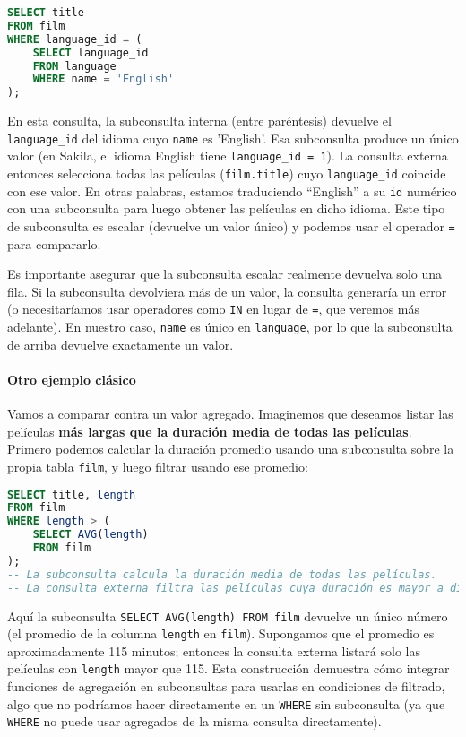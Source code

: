 \documentclass[12pt,a4paper]{article}
\begin{document}
\begin{lstlisting}[language=SQL]
SELECT title
FROM film
WHERE language_id = (
	SELECT language_id
	FROM language
	WHERE name = 'English'
);
\end{lstlisting}


En esta consulta, la subconsulta interna (entre paréntesis) devuelve el \texttt{language\_id} del idioma cuyo \texttt{name} es 'English'.
%
Esa subconsulta produce un único valor (en Sakila, el idioma English tiene \texttt{language\_id = 1}).
%
La consulta externa entonces selecciona todas las películas (\texttt{film.title}) cuyo \texttt{language\_id} coincide con ese valor.
%
En otras palabras, estamos traduciendo “English” a su \texttt{id} numérico con una subconsulta para luego obtener las películas en dicho idioma.
%
Este tipo de subconsulta es escalar (devuelve un valor único) y podemos usar el operador \texttt{=} para compararlo.


Es importante asegurar que la subconsulta escalar realmente devuelva solo una fila.
%
Si la subconsulta devolviera más de un valor, la consulta generaría un error (o necesitaríamos usar operadores como \texttt{IN} en lugar de \texttt{=}, que veremos más adelante).
%
En nuestro caso, \texttt{name} es único en \texttt{language}, por lo que la subconsulta de arriba devuelve exactamente un valor.


\paragraph{Otro ejemplo clásico}

Vamos a comparar contra un valor agregado.
%
Imaginemos que deseamos listar las películas \textbf{más largas que la duración media de todas las películas}.
%
Primero podemos calcular la duración promedio usando una subconsulta sobre la propia tabla \texttt{film}, y luego filtrar usando ese promedio: 


\begin{lstlisting}[language=SQL]
SELECT title, length
FROM film
WHERE length > (
	SELECT AVG(length)
	FROM film
);
-- La subconsulta calcula la duración media de todas las películas.
-- La consulta externa filtra las películas cuya duración es mayor a dicha media.
\end{lstlisting}


Aquí la subconsulta \texttt{SELECT AVG(length) FROM film} devuelve un único número (el promedio de la columna \texttt{length} en \texttt{film}).
%
Supongamos que el promedio es aproximadamente 115 minutos; entonces la consulta externa listará solo las películas con \texttt{length} mayor que 115.
%
Esta construcción demuestra cómo integrar funciones de agregación en subconsultas para usarlas en condiciones de filtrado, algo que no podríamos hacer directamente en un \texttt{WHERE} sin subconsulta (ya que \texttt{WHERE} no puede usar agregados de la misma consulta directamente). 
\end{document}
